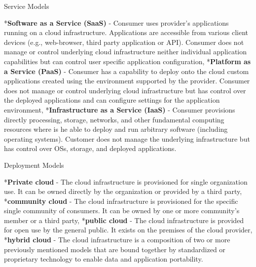 \seccc Service Models

\begitems
	*{\bf Software as a Service (SaaS)} - Consumer uses provider's applications running on a cloud infrastructure. Applications are accessible from various client devices (e.g., web-browser, third party application or API). Consumer does not manage or control underlying cloud infrastructure neither individual application capabilities but can control user specific application configuration,
	*{\bf Platform as a Service (PaaS)} - Consumer has a capability to deploy onto the cloud custom applications created using the environment supported by the provider. Consumer does not manage or control underlying cloud infrastructure but has control over the deployed applications and can configure settings for the application environment,
	*{\bf Infrastructure as a Service (IaaS)} - Consumer provisions directly processing, storage, networks, and other fundamental computing resources where is he able to deploy and run arbitrary software (including operating systems). Customer does not manage the underlying infrastructure but has control over OSs, storage, and deployed applications.
\enditems

\seccc Deployment Models

\begitems
	*{\bf Private cloud} - The cloud infrastructure is provisioned for single organization use. It can be owned directly by the organization or provided by a third party,
	*{\bf community cloud} - The cloud infrastructure is provisioned for the specific single community of consumers. It can be owned by one or more community's member or a third party,
	*{\bf public cloud} - The cloud infrastructure is provided for open use by the general public. It exists on the premises of the cloud provider,
	*{\bf hybrid cloud} - The cloud infrastructure is a composition of two or more previously mentioned models that are bound together by standardized or proprietary technology to enable data and application portability.
	
\enditems

